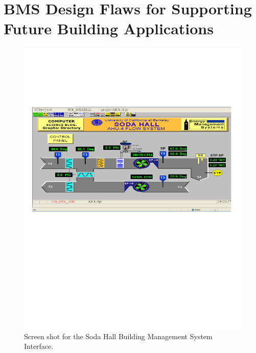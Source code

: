 


\section{BMS Design Flaws for Supporting Future Building Applications}

\begin{figure}[t!] %
\centering
\includegraphics[width=0.75\columnwidth]{figs/soda_bms_screenshot}
\caption{Screen shot for the Soda Hall Building Management System Interface.}
\label{fig:soda_bms_screenshot}
\end{figure}

